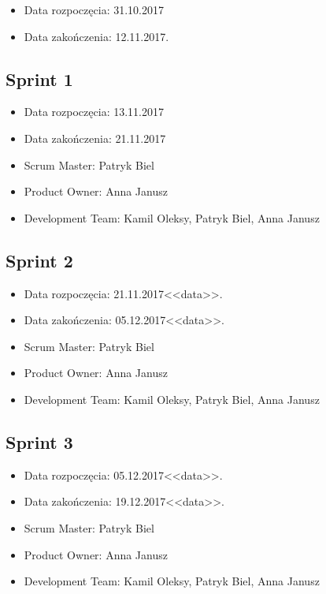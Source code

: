 ﻿\documentclass[a4paper]{article}
\begin{document}
\begin{itemize}
\item Data rozpoczęcia: 31.10.2017
\item  Data zakończenia: 12.11.2017.
\end{itemize}

\subsection{Sprint 1}

\begin{itemize}
\item Data rozpoczęcia:  13.11.2017
\item Data zakończenia: 21.11.2017
\item Scrum Master: Patryk Biel
\item Product Owner: Anna Janusz
\item Development Team: Kamil Oleksy, Patryk Biel, Anna Janusz
\end{itemize}

\subsection{Sprint 2}

\begin{itemize}
\item Data rozpoczęcia: 21.11.2017<<data>>.
\item  Data zakończenia: 05.12.2017<<data>>.
\item Scrum Master: Patryk Biel
\item Product Owner: Anna Janusz
\item Development Team: Kamil Oleksy, Patryk Biel, Anna Janusz
\end{itemize}

\subsection{Sprint 3}

\begin{itemize}
\item Data rozpoczęcia: 05.12.2017<<data>>.
\item  Data zakończenia: 19.12.2017<<data>>.
\item Scrum Master: Patryk Biel
\item Product Owner: Anna Janusz
\item Development Team: Kamil Oleksy, Patryk Biel, Anna Janusz
\end{itemize}
\end{document}
